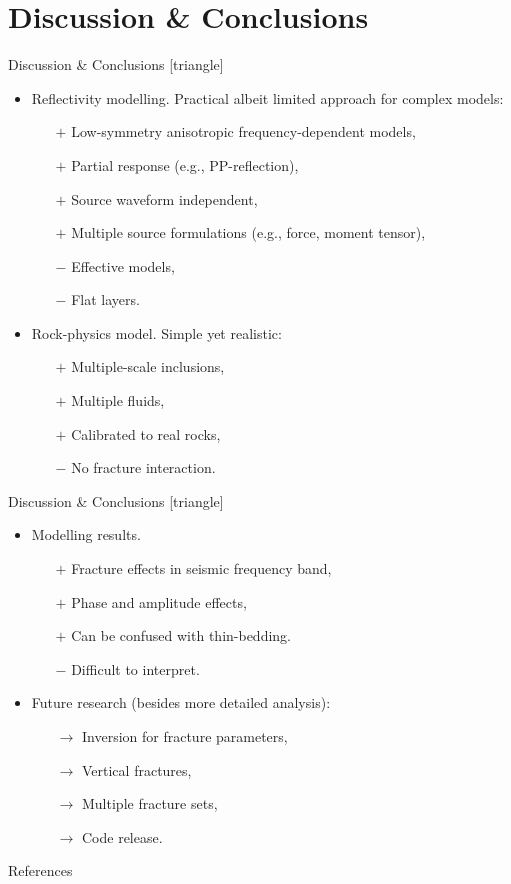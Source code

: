 \documentclass[aspectratio=169]{beamer}
\begin{document}
\section{Discussion \& Conclusions}
\begin{frame}{Discussion \& Conclusions}
[triangle]\large
\begin{itemize}
	\item Reflectivity modelling. Practical albeit limited approach for complex models:
		\begin{itemize}
			\item[$+$] Low-symmetry anisotropic frequency-dependent models,
			\item[$+$] Partial response (e.g., PP-reflection),
			\item[$+$] Source waveform independent,
			\item[$+$] Multiple source formulations (e.g., force, moment tensor),
			\item[$-$] Effective models,
			\item[$-$] Flat layers.
		\end{itemize}\pause
	\item Rock-physics model. Simple yet realistic:
		\begin{itemize}
			\item[$+$] Multiple-scale inclusions,
			\item[$+$] Multiple fluids,
			\item[$+$] Calibrated to real rocks,
			\item[$-$] No fracture interaction.
		\end{itemize}
\end{itemize}
\end{frame}
\begin{frame}{Discussion \& Conclusions}
[triangle]\large
\begin{itemize}
	\item Modelling results. 
		\begin{itemize}
			\item[$+$] Fracture effects in seismic frequency band,
			\item[$+$] Phase and amplitude effects,
			\item[$+$] Can be confused with thin-bedding.
			\item[$-$] Difficult to interpret.
		\end{itemize}\pause
	\item Future research (besides more detailed analysis):
		\begin{itemize}
			\item[$\rightarrow$] Inversion for fracture parameters,
			\item[$\rightarrow$] Vertical fractures,
			\item[$\rightarrow$] Multiple fracture sets,
			\item[$\rightarrow$] Code release.
		\end{itemize}
\end{itemize}
\end{frame}

\begin{frame}{References}
\centering


\end{frame}

\end{document}
